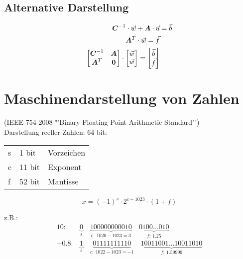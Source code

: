 \subsection{Alternative Darstellung}
\begin{align}
	\boldsymbol {C}^{-1} \cdot \vec{w} + \boldsymbol {A} \cdot \vec{u} &= \vec{b}\\
	\boldsymbol {A}^T \cdot \vec{w} = \vec{f}\\
	\begin{bmatrix}
	\boldsymbol {C}^{-1} & \boldsymbol {A} \\ \boldsymbol {A}^T & \boldsymbol {0}\end{bmatrix} \cdot \begin{bmatrix}\vec{w} \\ \vec{w}\end{bmatrix} = \begin{bmatrix}\vec{b}\\\vec{f}\end{bmatrix}
\end{align}

\section{Maschinendarstellung von Zahlen}
(IEEE 754-2008-"'Binary Floating Point Arithmetic Standard"')\\
Darstellung reeller Zahlen: 64 bit:\\
\begin{tabular}{lll}
	s & 1 bit & Vorzeichen\\
	c & 11 bit & Exponent\\
	f & 52 bit & Mantisse
\end{tabular}

\[ x = (-1)^s \cdot 2 ^{c-1023}\cdot (1 + f)\]

z.B.: 
\begin{align}
	10:& \underbrace{0}_{s} \quad \underbrace{100000000010}_{c:\ 1026-1023=3}\quad\underbrace{0100\ldots010}_{f:\ \num{1.25}}\\
	\num{-0.8}:& \underbrace{1}_{s} \quad \underbrace{01111111110}_{c:\ 1022-1023=-1}\quad\underbrace{10011001\ldots10011010}_{f:\ \num{1.59999}}
\end{align}

